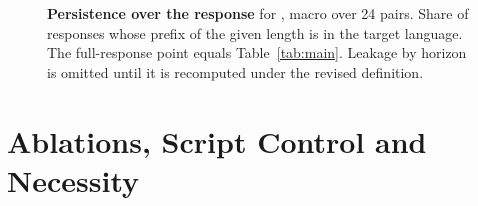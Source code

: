 \begin{figure}[!htbp]
  \centering
  \caption{\textbf{Persistence over the response} for \foxp, macro over 24 pairs. Share of responses whose prefix of the given length is in the target language. The full-response point equals Table~\ref{tab:main}. Leakage by horizon is omitted until it is recomputed under the revised definition.}
  \label{fig:app-horizon}
\end{figure}

\clearpage
\section{Ablations, Script Control and Necessity}
\label{app:mechanism}

